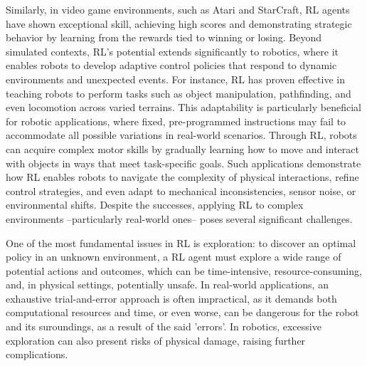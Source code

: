 Similarly, in video game environments, such as Atari and StarCraft, RL agents have shown exceptional skill, achieving
high scores and demonstrating strategic behavior by learning from the rewards tied to winning or losing.
Beyond simulated contexts, RL’s potential extends significantly to robotics, where it enables robots to develop
adaptive control policies that respond to dynamic environments and unexpected events.
For instance, RL has proven effective in teaching robots to perform tasks such as object manipulation, pathfinding, and
even locomotion across varied terrains.
This adaptability is particularly beneficial for robotic applications, where fixed, pre-programmed instructions may
fail to accommodate all possible variations in real-world scenarios.
Through RL, robots can acquire complex motor skills by gradually learning how to move and interact with objects in ways
that meet task-specific goals.
Such applications demonstrate how RL enables robots to navigate the complexity of physical interactions, refine control
strategies, and even adapt to mechanical inconsistencies, sensor noise, or environmental shifts.
Despite the successes, applying RL to complex environments --particularly real-world ones-- poses several significant
challenges.

One of the most fundamental issues in RL is exploration: to discover an optimal policy in an unknown environment,
a RL agent must explore a wide
range of potential actions and outcomes, which can be time-intensive, resource-consuming, and, in physical settings,
potentially unsafe.
In real-world applications, an exhaustive trial-and-error approach is often impractical, as it demands both
computational resources and time, or even worse, can be dangerous for the robot and its suroundings, as a result of the said 'errors'.
In robotics, excessive exploration can also present risks of physical damage, raising further complications.  %

